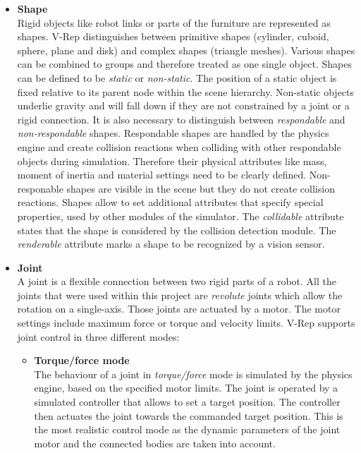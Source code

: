 \begin{itemize}
\item \textbf{Shape} \\
Rigid objects like robot links or parts of the furniture are represented as shapes. V-Rep distinguishes between primitive shapes (cylinder, cuboid, sphere, plane and disk) and complex shapes (triangle meshes). Various shapes can be combined to groups and therefore treated as one single object. Shapes can be defined to be \emph{static} or \emph{non-static}. The position of a static object is fixed relative to its parent node within the scene hierarchy. Non-static objects underlie gravity and will fall down if they are not constrained by a joint or a rigid connection. It is also necessary to distinguish between \emph{respondable} and \emph{non-respondable} shapes. Respondable shapes are handled by the physics engine and create collision reactions when colliding with other respondable objects during simulation. Therefore their physical attributes like mass, moment of inertia and material settings need to be clearly defined. Non-responable shapes are visible in the scene but they do not create collision reactions. Shapes allow to set additional attributes that specify special properties, used by other modules of the simulator. The \emph{collidable} attribute states that the shape is considered by the collision detection module. The \emph{renderable} attribute marks a shape to be recognized by a vision sensor.

\item \textbf{Joint} \\
A joint is a flexible connection between two rigid parts of a robot. All the joints that were used within this project are \emph{revolute} joints which allow the rotation on a single-axis. Those joints are actuated by a motor. The motor settings include maximum force or torque and velocity limits. V-Rep supports joint control in three different modes:
\begin{itemize}

\item \textbf{Torque/force mode} \\
The behaviour of a joint in \emph{torque/force} mode is simulated by the physics engine, based on the specified motor limits. The joint is operated by a simulated controller that allows to set a target position. The controller then actuates the joint towards the commanded target position. This is the most realistic control mode as the dynamic parameters of the joint motor and the connected bodies are taken into account.


\end{itemize}
\end{itemize}

